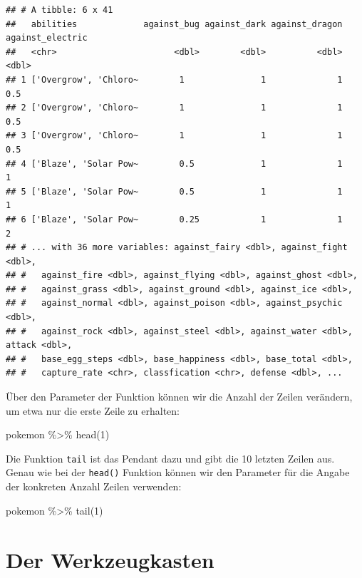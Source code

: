 \documentclass[
]{book}
\newenvironment{Shaded}{\begin{snugshade}}{\end{snugshade}}
\newcommand{\DecValTok}[1]{\textcolor[rgb]{0.00,0.00,0.81}{#1}}
\newcommand{\FunctionTok}[1]{\textcolor[rgb]{0.00,0.00,0.00}{#1}}
\newcommand{\NormalTok}[1]{#1}
\newcommand{\SpecialCharTok}[1]{\textcolor[rgb]{0.00,0.00,0.00}{#1}}
\begin{document}
\begin{verbatim}
## # A tibble: 6 x 41
##   abilities             against_bug against_dark against_dragon against_electric
##   <chr>                       <dbl>        <dbl>          <dbl>            <dbl>
## 1 ['Overgrow', 'Chloro~        1               1              1              0.5
## 2 ['Overgrow', 'Chloro~        1               1              1              0.5
## 3 ['Overgrow', 'Chloro~        1               1              1              0.5
## 4 ['Blaze', 'Solar Pow~        0.5             1              1              1  
## 5 ['Blaze', 'Solar Pow~        0.5             1              1              1  
## 6 ['Blaze', 'Solar Pow~        0.25            1              1              2  
## # ... with 36 more variables: against_fairy <dbl>, against_fight <dbl>,
## #   against_fire <dbl>, against_flying <dbl>, against_ghost <dbl>,
## #   against_grass <dbl>, against_ground <dbl>, against_ice <dbl>,
## #   against_normal <dbl>, against_poison <dbl>, against_psychic <dbl>,
## #   against_rock <dbl>, against_steel <dbl>, against_water <dbl>, attack <dbl>,
## #   base_egg_steps <dbl>, base_happiness <dbl>, base_total <dbl>,
## #   capture_rate <chr>, classfication <chr>, defense <dbl>, ...
\end{verbatim}

Über den Parameter der Funktion können wir die Anzahl der Zeilen verändern, um etwa nur die erste Zeile zu erhalten:

\begin{Shaded}
\begin{Highlighting}[]
\NormalTok{pokemon }\SpecialCharTok{\%\textgreater{}\%} 
  \FunctionTok{head}\NormalTok{(}\DecValTok{1}\NormalTok{)}
\end{Highlighting}
\end{Shaded}

Die Funktion \texttt{tail} ist das Pendant dazu und gibt die 10 letzten Zeilen aus. Genau wie bei der \texttt{head()} Funktion können wir den Parameter für die Angabe der konkreten Anzahl Zeilen verwenden:

\begin{Shaded}
\begin{Highlighting}[]
\NormalTok{pokemon }\SpecialCharTok{\%\textgreater{}\%}
  \FunctionTok{tail}\NormalTok{(}\DecValTok{1}\NormalTok{)}
\end{Highlighting}
\end{Shaded}

\hypertarget{der-werkzeugkasten}{%
\chapter{Der Werkzeugkasten}\label{der-werkzeugkasten}}
\end{document}
